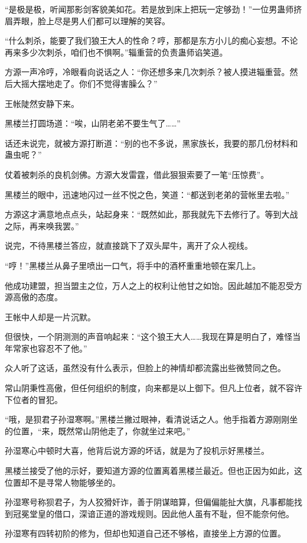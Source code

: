 \begin{this_body}
“是极是极，听闻那影剑客貌美如花。若是放到床上把玩一定够劲！”一位男蛊师挤眉弄眼，脸上尽是男人们都可以理解的笑容。

“什么刺杀，能要了我们狼王大人的性命？哼，那都是东方小儿的痴心妄想。不论再来多少次刺杀，咱们也不惧啊。”辎重营的负责蛊师谄笑道。

方源一声冷哼，冷眼看向说话之人：“你还想多来几次刺杀？被人摸进辎重营。然后大摇大摆地走了。你们不觉得害臊么？”

王帐陡然安静下来。

黑楼兰打圆场道：“唉，山阴老弟不要生气了……”

话还未说完，就被方源打断道：“别的也不多说，黑家族长，我要的那几份材料和蛊虫呢？”

仗着被刺杀的良机剑佛。方源大发雷霆，借此狠狠索要了一笔“压惊费”。

黑楼兰的眼中，迅速地闪过一丝不悦之色，笑道：“都送到老弟的营帐里去啦。”

方源这才满意地点点头，站起身来：“既然如此，那我就先下去修行了。等到大战之际，再来唤我罢。”

说完，不待黑楼兰答应，就直接跳下了双头犀牛，离开了众人视线。

“哼！”黑楼兰从鼻子里喷出一口气，将手中的酒杯重重地顿在案几上。

他成功建盟，担当盟主之位，万人之上的权利让他甘之如饴。因此越加不能忍受方源高傲的态度。

王帐中人却是一片沉默。

但很快，一个阴测测的声音响起来：“这个狼王大人……我现在算是明白了，难怪当年常家也容忍不了他。”

众人听了这话，虽然没有什么表示，但脸上的神情却都流露出些微赞同之色。

常山阴秉性高傲，但任何组织的制度，向来都是以上御下。但凡上位者，就不容许下位者的冒犯。

“哦，是狈君子孙湿寒啊。”黑楼兰撇过眼神，看清说话之人。他手指着方源刚刚坐的位置，“来，既然常山阴他走了，你就坐过来吧。”

孙湿寒心中顿时大喜，他背后说方源的坏话，就是为了投机示好黑楼兰。

黑楼兰接受了他的示好，要知道方源的位置离着黑楼兰最近。但也正因为如此，这位置却不是寻常人物能够坐的。

孙湿寒号称狈君子，为人狡猾奸诈，善于阴谋暗算，但偏偏能扯大旗，凡事都能找到冠冕堂皇的借口，深谙正道的游戏规则。因此他人虽有不耻，但不能奈何他。

孙湿寒有四转初阶的修为，但却也知道自己还不够格，直接坐上方源的位置。


\end{this_body}
